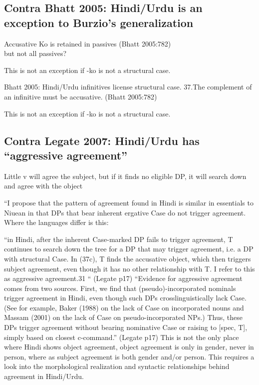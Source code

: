 \documentclass{article}
\begin{document}
\subsection{Contra Bhatt 2005: Hindi/Urdu is an exception to Burzio's generalization}

\begin{example}Accusative Ko is retained in passives (Bhatt 2005:782)\\
but not all passives?
\end{example}

This is not an exception if -ko is not a structural case.

Bhatt 2005: Hindi/Urdu infinitives license structural case.
37.The complement of an infinitive must be accusative. (Bhatt 2005:782)

This is not an exception if -ko is not a structural case.

\subsection{Contra Legate 2007: Hindi/Urdu has ``aggressive agreement”}

Little v will agree the subject, but if it finds no eligible DP, it will search down and agree with the object


``I propose that the pattern of agreement found in Hindi is similar in essentials to Niuean in that DPs that bear inherent ergative Case do not trigger agreement. Where the languages differ is this:


``in Hindi, after the inherent Case-marked DP fails to trigger agreement, T continues to search down the tree for a DP that may trigger agreement, i.e. a DP with structural Case. In (37c), T finds the accusative object, which then triggers subject agreement, even though it has no other relationship with T. I refer to this as aggressive agreement.31 `` (Legate p17) ``Evidence for aggressive agreement comes from two sources. First, we find that (pseudo)-incorporated nominals trigger agreement in Hindi, even though such DPs crosslinguistically lack Case. (See for example, Baker (1988) on the lack of Case on incorporated nouns and Massam (2001) on the lack of Case on pseudo-incorporated NPs.) Thus, these DPs trigger agreement without bearing nominative Case or raising to [spec, T], simply based on closest c-command.” (Legate p17)
This is not the only place where Hindi shows object agreement, object agreement  is only in gender, never in person, where as subject agreement is both gender and/or person. This requires a look into the morphological realization and syntactic relationships behind agreement in Hindi/Urdu.
\end{document}

